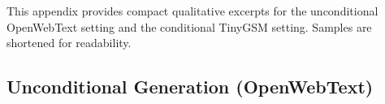 \newcommand{\qualfirstgroup}[1]{%
\vspace{-0.4mm}
{\scriptsize\bfseries\textcolor{owtgreen}{#1}}\\[-0.2mm]}

\newcommand{\qualrowsep}{\par\vspace{1.0mm}}

\newcommand{\owtrow}[4]{%
\noindent
\begin{minipage}[t]{0.31\linewidth}
{\footnotesize\bfseries\textcolor{owtgreen}{#1 / #2 Sampling steps}}\\[-0.1mm]
{\scriptsize\bfseries #3}
\end{minipage}\hfill
\begin{minipage}[t]{0.66\linewidth}
{\scriptsize #4}
\end{minipage}}

\newcommand{\condmetric}[1]{%
{\scriptsize\bfseries\textcolor{tinyorange}{Accuracy:} #1}\\[-0.1mm]}

\newcommand{\condrowsep}{%
\par\vspace{0.8mm}
\noindent\begin{tikzpicture}
\draw[tinyorange, densely dashed, line width=0.45pt] (0,0) -- (\linewidth,0);
\end{tikzpicture}
\vspace{-0.8mm}}

This appendix provides compact qualitative excerpts for the unconditional OpenWebText setting and the conditional TinyGSM setting. Samples are shortened for readability.

\subsection{Unconditional Generation (OpenWebText)}
\label{app:owt-qualitative-samples}

